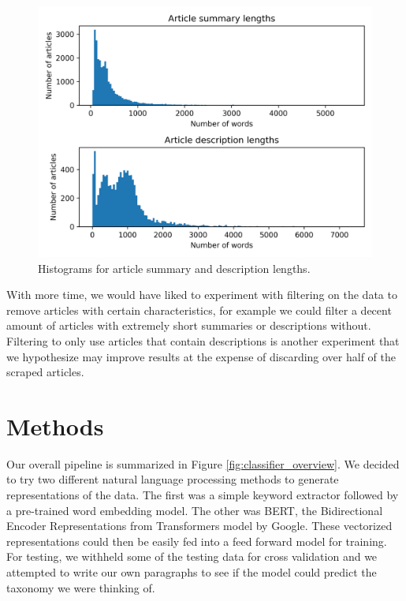 \documentclass[10pt,twocolumn,letterpaper]{article}
\begin{document}
\begin{figure}
  \includegraphics[width=\linewidth]{article_lengths.png}
  \caption{Histograms for article summary and description lengths.}
  \label{fig:article_lengths}
\end{figure}

With more time, we would have liked to experiment with filtering on the data to remove articles with certain characteristics, for example we could filter a decent amount of articles with extremely short summaries or descriptions without. Filtering to only use articles that contain descriptions is another experiment that we hypothesize may improve results at the expense of discarding over half of the scraped articles. 

\section{Methods}
\label{section:methods}

Our overall pipeline is summarized in Figure \ref{fig:classifier_overview}. We decided to try two different natural language processing methods to generate representations of the data. The first was a simple keyword extractor followed by a pre-trained word embedding model. The other was BERT, the Bidirectional Encoder Representations from Transformers model by Google. These vectorized representations could then be easily fed into a feed forward model for training. For testing, we withheld some of the testing data for cross validation and we attempted to write our own paragraphs to see if the model could predict the taxonomy we were thinking of. 
\end{document}
